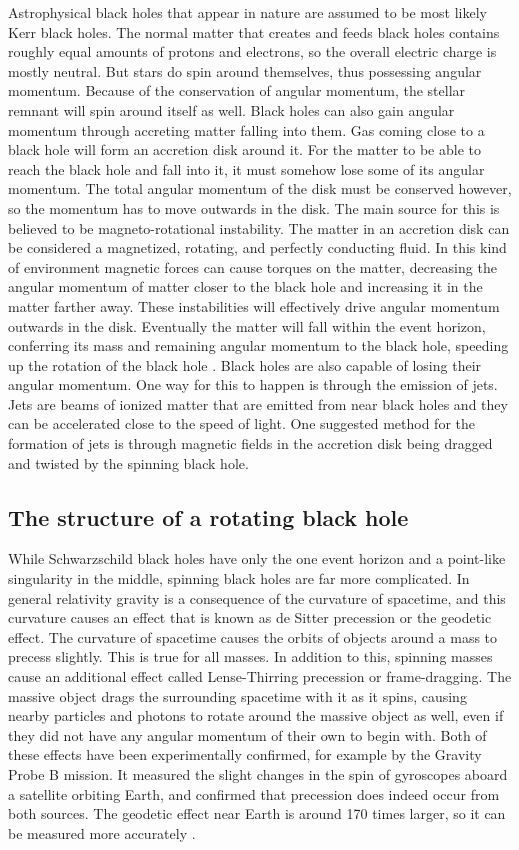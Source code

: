 \documentclass[english, oneside]{HYgradu}
\begin{document}
Astrophysical black holes that appear in nature are assumed to be most likely Kerr black holes. The normal matter that creates and feeds black holes contains roughly equal amounts of protons and electrons, so the overall electric charge is mostly neutral. But stars do spin around themselves, thus possessing angular momentum. Because of the conservation of angular momentum, the stellar remnant will spin around itself as well. Black holes can also gain angular momentum through accreting matter falling into them. Gas coming close to a black hole will form an accretion disk around it. For the matter to be able to reach the black hole and fall into it, it must somehow lose some of its angular momentum. The total angular momentum of the disk must be conserved however, so the momentum has to move outwards in the disk.
The main source for this is believed to be magneto-rotational instability. The matter in an accretion disk can be considered a magnetized, rotating, and perfectly conducting fluid. In this kind of environment magnetic forces can cause torques on the matter, decreasing the angular momentum of matter closer to the black hole and increasing it in the matter farther away. These instabilities will effectively drive angular momentum outwards in the disk.
Eventually the matter will fall within the event horizon, conferring its mass and remaining angular momentum to the black hole, speeding up the rotation of the black hole \citep{bhphysics}. Black holes are also capable of losing their angular momentum. One way for this to happen is through the emission of jets. Jets are beams of ionized matter that are emitted from near black holes and they can be accelerated close to the speed of light. One suggested method for the formation of jets is through magnetic fields in the accretion disk being dragged and twisted by the spinning black hole.

\subsection{The structure of a rotating black hole}

While Schwarzschild black holes have only the one event horizon and a point-like singularity in the middle, spinning black holes are far more complicated. In general relativity gravity is a consequence of the curvature of spacetime, and this curvature causes an effect that is known as de Sitter precession or the geodetic effect. The curvature of spacetime causes the orbits of objects around a mass to precess slightly. This is true for all masses. In addition to this, spinning masses cause an additional effect called Lense-Thirring precession or frame-dragging. The massive object drags the surrounding spacetime with it as it spins, causing nearby particles and photons to rotate around the massive object as well, even if they did not have any angular momentum of their own to begin with. Both of these effects have been experimentally confirmed, for example by the Gravity Probe B mission. It measured the slight changes in the spin of gyroscopes aboard a satellite orbiting Earth, and confirmed that precession does indeed occur from both sources. The geodetic effect near Earth is around 170 times larger, so it can be measured more accurately \citep{everitt:2009}.
\end{document}
